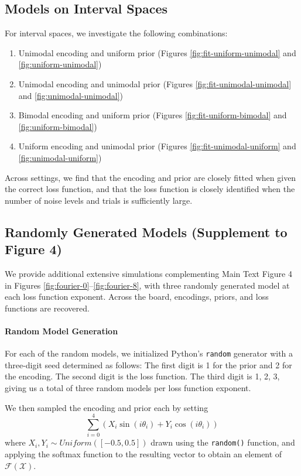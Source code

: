 \documentclass[si.tex]{subfiles}
\begin{document}



\subsection{Models on Interval Spaces}\label{sec:further-interval}
For interval spaces, we investigate the following combinations:
\begin{enumerate}
\item Unimodal encoding and uniform prior (Figures \ref{fig:fit-uniform-unimodal} and \ref{fig:uniform-unimodal})
\item Unimodal encoding and unimodal prior (Figures \ref{fig:fit-unimodal-unimodal} and \ref{fig:unimodal-unimodal})
\item Bimodal encoding and uniform prior (Figures \ref{fig:fit-uniform-bimodal} and \ref{fig:uniform-bimodal})
\item Uniform encoding and unimodal prior (Figures \ref{fig:fit-unimodal-uniform} and \ref{fig:unimodal-uniform})
\end{enumerate}
Across settings, we find that the encoding and prior are closely fitted when given the correct loss function, and that the loss function is closely identified when the number of noise levels and trials is sufficiently large.





\subsection{Randomly Generated Models (Supplement to Figure 4)}
We provide additional extensive simulations complementing Main Text Figure 4 in  Figures \ref{fig:fourier-0}--\ref{fig:fourier-8}, with three randomly generated model at each loss function exponent.
Across the board, encodings, priors, and loss functions are recovered.



\paragraph*{Random Model Generation}
For each of the random models, we initialized Python's \texttt{random} generator with a three-digit seed determined as follows: The first digit is 1 for the prior and 2 for the encoding. The second digit is the loss function. The third digit is 1, 2, 3, giving us a total of three random models per loss function exponent.

We then sampled the encoding and prior each by setting
\begin{equation}
\sum_{i=0}^4 \left( X_i \sin(i \theta_i) + Y_i \cos(i \theta_i) \right)
\end{equation}
where $X_i, Y_i \sim Uniform([-0.5, 0.5])$ drawn using the \texttt{random()} function, and applying the softmax function to the resulting vector to obtain an element of $\mathcal{F}(\mathcal{X})$.




\end{document}
